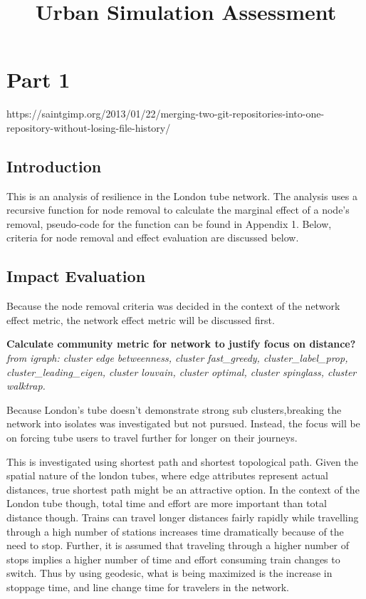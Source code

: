 \documentclass[11pt]{article} %
\title{\vspace{-3.0cm}Urban Simulation Assessment}
\begin{document}
\maketitle


\section{Part 1}

https://saintgimp.org/2013/01/22/merging-two-git-repositories-into-one-repository-without-losing-file-history/

\subsection{Introduction}

This is an analysis of resilience in the London tube network. The analysis uses a recursive function for node removal to calculate the marginal effect of a node's removal, pseudo-code for the function can be found in Appendix 1. Below, criteria for node removal and effect evaluation are discussed below. 


\subsection{Impact Evaluation}

Because the node removal criteria was decided in the context of the network effect metric, the network effect metric will be discussed first. 

\textbf{Calculate community metric for network to justify focus on distance?}
\textit{from igraph: cluster edge betweenness, cluster fast\_greedy, cluster\_label\_prop, cluster\_leading\_eigen, cluster louvain, cluster optimal, cluster spinglass, cluster walktrap.}

Because London's tube doesn't demonstrate strong sub clusters,breaking the network into isolates was investigated but not pursued. Instead, the focus will be on forcing tube users to travel further for longer on their journeys. 

This is investigated using shortest path and shortest topological path. Given the spatial nature of the london tubes, where edge attributes represent actual distances, true shortest path might be an attractive option. In the context of the London tube though, total time and effort are more important than total distance though. Trains can travel longer distances fairly rapidly while travelling through a high number of stations increases time dramatically because of the need to stop. Further, it is assumed that traveling through a higher number of stops implies a higher number of time and effort consuming train changes to switch. Thus by using geodesic, what is being maximized is the increase in stoppage time, and line change time for travelers in the network.
\end{document}

